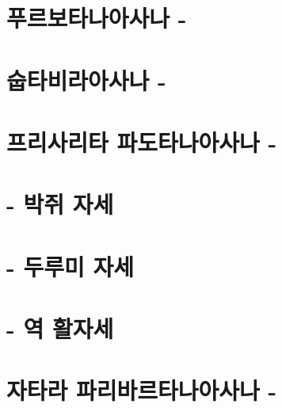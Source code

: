 \documentclass[12pt, a4paper, oneside]{book}
\let\stdsection\section
\renewcommand\section{\newpage\stdsection}
\begin{document}
%
	\section{푸르보타나아사나 - }


%
	\section{숩타비라아사나 - }



%
	\section{프리사리타 파도타나아사나 - }

%
	\section{ - 박쥐 자세 }


%
	\section{ - 두루미 자세}


%
	\section{ - 역 활자세 }

%
	\section{자타라 파리바르타나아사나 - }
\end{document}
